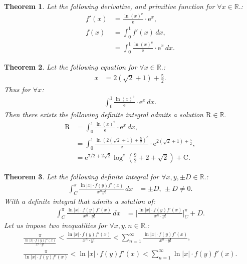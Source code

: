 \documentclass[10pt]{article}
\theoremstyle{plain}
\newtheorem{theorem}{Theorem}[section]
\theoremstyle{definition}
\theoremstyle{remark}
\begin{document}
\begin{theorem}
	Let the following derivative, and primitive function for $\forall x \in \mathbb{R}.$:
	\begin{align*}
		f'(x)&= \frac{\ln (x)^{\mathrm{e}}}{\mathrm{e}} \cdot \mathrm{e}^{x},\\
		f(x) &= \int_{0}^{1} f'(x)\, dx,\\
		&= \int_{0}^{1} \frac{\ln (x)^{\mathrm{e}}}{\mathrm{e}} \cdot \mathrm{e}^{x} \, dx.
	\end{align*}
\end{theorem}

\begin{theorem}
	Let the following equation for $\forall x \in \mathbb{R}.$:
	\begin{align*}
		x &= 2(\sqrt{2} + 1) + \frac{5}{2}.
	\end{align*}
	Thus for $\forall x$:
	\begin{align*}
		\int_{0}^{1} \frac{\ln (x)^{\mathrm{e}}}{\mathrm{e}} \cdot \mathrm{e}^{x} \, dx.
	\end{align*}
	Then there exists the following definite integral admits a solution $\mathrm{R} \in \mathbb{R}.$
	\begin{align*}
		\mathrm{R} &= \int_{0}^{1} \frac{\ln (x)^{\mathrm{e}}}{\mathrm{e}} \cdot \mathrm{e}^{x} \, dx,\\
		&= \int_{0}^{1} \frac{\ln (2(\sqrt{2} + 1) + \frac{5}{2})^{\mathrm{e}}}{\mathrm{e}} \cdot \mathrm{e}^{2(\sqrt{2} + 1) + \frac{5}{2}},\\
		&= \mathrm{e}^{7/2+2 \sqrt{2}} \log^{e}(\frac{9}{2}+2+\sqrt{2}) + \mathrm{C}.
	\end{align*}
\end{theorem}

\begin{theorem}
	Let the following definite integral for $\forall x, y, \pm D \in \mathbb{R}.$:
	\begin{align*}
		\int_{C}^{\pi} \frac{ \ln |x| \cdot f(y)f'(x) }{x^{n}y!} \, dx &= \pm D, \, \pm D \neq 0.
	\end{align*}
	With a definite integral that admits a solution of:
	\begin{align*}
		\int_{C}^{\pi} \frac{ \ln |x| \cdot f(y)f'(x) }{x^{n} \cdot y!} \, dx &= \big[\frac{ \ln |x| \cdot f(y)f'(x) }{x^{n} \cdot y!}\big]_{C}^{\pi} + D.
	\end{align*}
	Let us impose two inequalities for $\forall x, y, n \in \mathbb{R}.$:
	\begin{align*}
		\frac{\pi}{\frac{ \ln |x| \cdot f(y)f'(x) }{x^{n} \cdot  y!}} < \frac{ \ln |x| \cdot f(y)f'(x) }{x^{n} \cdot y!} < \sum_{n=1}^{\infty} \frac{ \ln |x| \cdot f(y)f'(x) }{x^{n} \cdot y!},\\
	\frac{\pi}{\ln |x| \cdot f(y)f'(x) } < \ln |x| \cdot f(y)f'(x)  < \sum_{n=1}^{\infty} \ln |x| \cdot f(y)f'(x).
	\end{align*}
\end{theorem}
\end{document}
